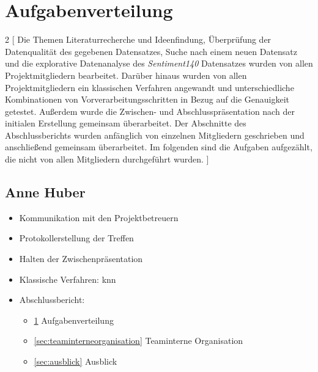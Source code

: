 \section{Aufgabenverteilung}\label{sec:aufgabenverteilung}

\begin{multicols}{2}
[
Die Themen Literaturrecherche und Ideenfindung, Überprüfung der Datenqualität des gegebenen Datensatzes, Suche nach einem neuen Datensatz und die explorative Datenanalyse des \textit{Sentiment140} Datensatzes wurden von allen Projektmitgliedern bearbeitet.
Darüber hinaus wurden von allen Projektmitgliedern ein klassischen Verfahren angewandt und unterschiedliche Kombinationen von Vorverarbeitungsschritten in Bezug auf die Genauigkeit getestet.
Außerdem wurde die Zwischen- und Abschlusspräsentation nach der initialen Erstellung gemeinsam überarbeitet.
Der Abschnitte des Abschlussberichts wurden anfänglich von einzelnen Mitgliedern geschrieben und anschließend gemeinsam überarbeitet.
Im folgenden sind die Aufgaben aufgezählt, die nicht von allen Mitgliedern durchgeführt wurden.
]

\subsection{Anne Huber}
\begin{itemize}
    \item Kommunikation mit den Projektbetreuern
    \item Protokollerstellung der Treffen
    \item Halten der Zwischenpräsentation
    \item Klassische Verfahren: \gls{knn}
    \item Abschlussbericht:
    \begin{itemize}
        \item \ref{sec:aufgabenverteilung} Aufgabenverteilung
        \item \ref{sec:teaminterneorganisation} Teaminterne Organisation
        \item \ref{sec:ausblick} Ausblick
    \end{itemize}
\end{itemize}



\end{multicols}
